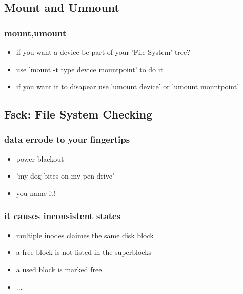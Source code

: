 \documentclass[hyperref={pdfpagelabels=false}]{beamer}
\begin{document}
    \subsection{Mount and Unmount}
	    \begin{frame}
			\frametitle{mount,umount}
			\begin{itemize}
                \item<1-> if you want a device be part of your 'File-System'-tree?
                \item<1-> use 'mount -t type device mountpoint' to do it
                \item<2-> if you want it to disapear use 'umount device' or 'umount mountpoint'
            \end{itemize}
		\end{frame}
    \subsection{Fsck: File System Checking}
	    \begin{frame}
			\frametitle{data errode to your fingertips}
			\begin{itemize}
                \item<1-> power blackout
                \item<1-> 'my dog bites on my pen-drive'
                \item<1-> you name it!
            \end{itemize}
        \end{frame}
        \begin{frame}
			\frametitle{it causes inconsistent states}
            \begin{itemize}
                \item<1-> multiple inodes claimes the same disk block
                \item<1-> a free block is not listed in the superblocks
                \item<1-> a used block is marked free
                \item<1-> ...
            \end{itemize}
		\end{frame}
\end{document}
